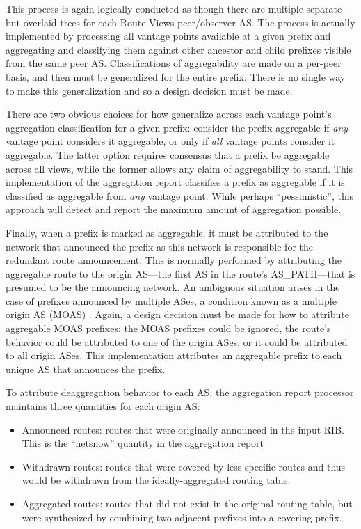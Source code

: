 This process is again logically conducted as though there are multiple separate but overlaid trees for each Route Views peer/observer AS. The process is actually implemented by processing all vantage points available at a given prefix and aggregating and classifying them against other ancestor and child prefixes visible from the same peer AS. Classifications of aggregability are made on a per-peer basis, and then must be generalized for the entire prefix. There is no single way to make this generalization and so a design decision must be made.

There are two obvious choices for how generalize across each vantage point's aggregation classification for a given prefix: consider the prefix aggregable if \emph{any} vantage point considers it aggregable, or only if \emph{all} vantage points consider it aggregable. The latter option requires consensus that a prefix be aggregable across all views, while the former allows any claim of aggregability to stand. This implementation of the aggregation report classifies a prefix as aggregable if it is classified as aggregable from \emph{any} vantage point. While perhaps ``pessimistic'', this approach will detect and report the maximum amount of aggregation possible.


Finally, when a prefix is marked as aggregable, it must be attributed to the network that announced the prefix as this network is responsible for the redundant route announcement. This is normally performed by attributing the aggregable route to the origin AS---the first AS in the route's AS\_PATH---that is presumed to be the announcing network. An ambiguous situation arises in the case of prefixes announced by multiple ASes, a condition known as a multiple origin AS (MOAS) \cite{Zhao:2001ly}. Again, a design decision must be made for how to attribute aggregable MOAS prefixes: the MOAS prefixes could be ignored, the route's behavior could be attributed to one of the origin ASes, or it could be attributed to all origin ASes. This implementation attributes an aggregable prefix to each unique AS that announces the prefix.

To attribute deaggregation behavior to each AS, the aggregation report processor maintains three quantities for each origin AS:

\begin{itemize}
\item{Announced routes: routes that were originally announced in the input RIB. This is the ``netsnow'' quantity in the aggregation report}
\item{Withdrawn routes: routes that were covered by less specific routes and thus would be withdrawn from the ideally-aggregated routing table.}
\item{Aggregated routes: routes that did not exist in the original routing table, but were synthesized by combining two adjacent prefixes into a covering prefix.}
\end{itemize}


